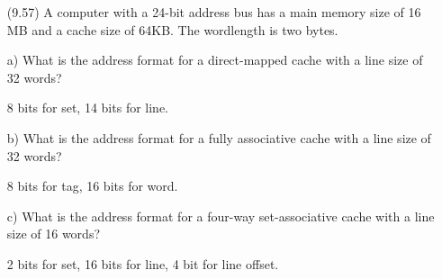 \documentclass[letterpaper,10pt,titlepage]{article}
\begin{document}
\begin{enumerate}
	\item[(9.57)] A computer with a 24-bit address bus has a main memory size of 16 MB
		and a cache size of 64KB. The wordlength is two bytes.
	\item[a)] What is the address format for a direct-mapped cache with a line size of
		32 words?
	\item[\textbullet] 8 bits for set, 14 bits for line.
	\item[b)] What is the address format for a fully associative cache with a line
		size of 32 words?
	\item[\textbullet] 8 bits for tag, 16 bits for word.
	\item[c)] What is the address format for a four-way set-associative cache with a
		line size of 16 words?
	\item[\textbullet] 2 bits for set, 16 bits for line, 4 bit for line offset.


\end{enumerate}
\end{document}
